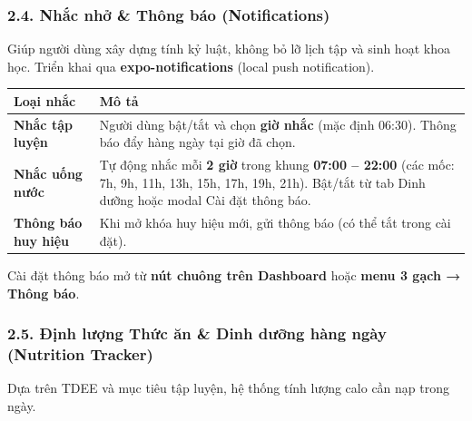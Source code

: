\documentclass[12pt,a4paper]{article}
\newcounter{none}
\begin{document}
\subsubsection{2.4. Nhắc nhở \& Thông báo
(Notifications)}\label{nhux1eafc-nhux1edf-thuxf4ng-buxe1o-notifications}

Giúp người dùng xây dựng tính kỷ luật, không bỏ lỡ lịch tập và sinh hoạt
khoa học. Triển khai qua \textbf{expo-notifications} (local push
notification).

{\def\LTcaptype{none} %
\begin{longtable}[]{@{}
  >{\raggedright\arraybackslash}p{}
  >{\raggedright\arraybackslash}p{}@{}}
\toprule\noalign{}
\begin{minipage}[b]{\linewidth}\raggedright
Loại nhắc
\end{minipage} & \begin{minipage}[b]{\linewidth}\raggedright
Mô tả
\end{minipage} \\
\midrule\noalign{}
\endhead
\bottomrule\noalign{}
\endlastfoot
\textbf{Nhắc tập luyện} & Người dùng bật/tắt và chọn \textbf{giờ nhắc}
(mặc định 06:30). Thông báo đẩy hàng ngày tại giờ đã chọn. \\
\textbf{Nhắc uống nước} & Tự động nhắc mỗi \textbf{2 giờ} trong khung
\textbf{07:00 -- 22:00} (các mốc: 7h, 9h, 11h, 13h, 15h, 17h, 19h, 21h).
Bật/tắt từ tab Dinh dưỡng hoặc modal Cài đặt thông báo. \\
\textbf{Thông báo huy hiệu} & Khi mở khóa huy hiệu mới, gửi thông báo
(có thể tắt trong cài đặt). \\
\end{longtable}
}

Cài đặt thông báo mở từ \textbf{nút chuông trên Dashboard} hoặc
\textbf{menu 3 gạch → Thông báo}.

\subsubsection{2.5. Định lượng Thức ăn \& Dinh dưỡng hàng ngày
(Nutrition
Tracker)}\label{ux111ux1ecbnh-lux1b0ux1ee3ng-thux1ee9c-ux103n-dinh-dux1b0ux1ee1ng-huxe0ng-nguxe0y-nutrition-tracker}

Dựa trên TDEE và mục tiêu tập luyện, hệ thống tính lượng calo cần nạp
trong ngày.
\end{document}
